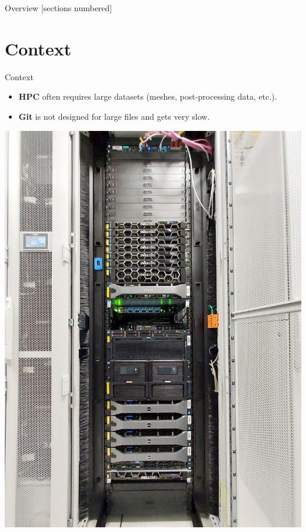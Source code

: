 \titleframe

\begin{frame}{Overview}
  [sections numbered]
  \tableofcontents[hideallsubsections]
\end{frame}

\section{Context}
\begin{frame}{Context}
  \begin{itemize}
    \item \textbf{HPC} often requires large datasets (meshes, post-processing data, etc.).
    \item \textbf{Git} is not designed for large files and gets very slow.
  \end{itemize}
  \begin{center}
    \begin{minipage}{0.49\textwidth}
      \centering
      \includegraphics[width=0.7\linewidth, angle=-90]{images/gaya.jpeg}
    \end{minipage}
    \hfill

\end{center}
\end{frame}
